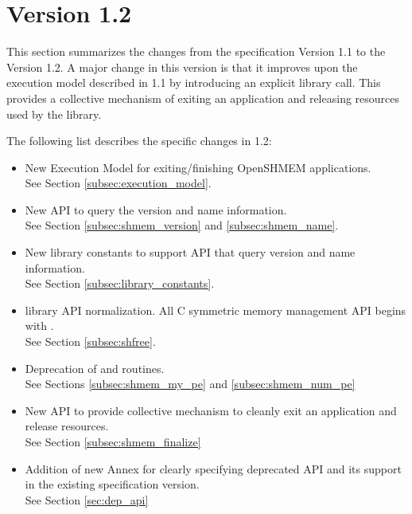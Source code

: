 \section{Version 1.2}
This section summarizes the changes from the \openshmem specification Version 1.1 to the Version 1.2.  
A major change in this version is that it improves upon the execution model described in 1.1 by introducing an explicit  library call. This provides a collective mechanism of exiting an \openshmem application and releasing resources used by the library.  



The following list describes the specific changes in 1.2:
\begin{itemize}
\item New Execution Model for exiting/finishing OpenSHMEM applications.
\\See Section  \ref{subsec:execution_model}.
\item New API to query the version and name information. 
\\See Section \ref{subsec:shmem_version} and \ref{subsec:shmem_name}.
\item New library constants to support API that query version and name information. 
\\See Section \ref{subsec:library_constants}.
\item \openshmem library API normalization. All C symmetric memory management API begins with  .
\\See Section \ref{subsec:shfree}.
\item Deprecation of  and  routines.
\\See Sections \ref{subsec:shmem_my_pe} and \ref{subsec:shmem_num_pe}
\item New API  to provide collective mechanism to cleanly exit an \openshmem application and release resources.
\\See Section \ref{subsec:shmem_finalize}
\item Addition of new Annex for clearly specifying deprecated API and its support in the existing specification version.
\\See Section \ref{sec:dep_api}

\end{itemize}
